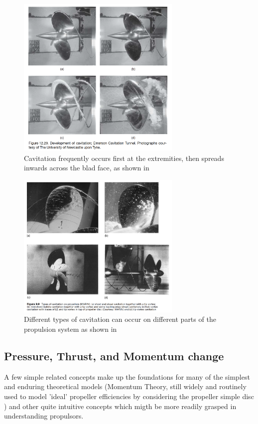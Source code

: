 \documentclass{article}\usepackage[]{graphicx}\usepackage[]{color}
\begin{document}
\begin{figure}
\includegraphics[width=0.7\textwidth]{IncreasingCavitation.png}
\caption{Cavitation frequently occurs first at the extremities, then spreads inwards across the blad face, as shown in \parencite{mollard2011}}
\label{fig:IncreasingCavitation.png}
\end{figure}

\begin{figure}
\includegraphics[width=0.7\textwidth]{CavitationTypes.png}
\caption{Different types of cavitation can occur on different parts of the propulsion system as shown in \parencite{carlton2007}}
\label{fig:CavitationTypes.png}
\end{figure}


\subsection{Pressure, Thrust, and Momentum change}
A few simple related concepts make up the foundations for many of the simplest and enduring theoretical models (Momentum Theory, still widely and routinely used to model 'ideal' propeller efficiencies by considering the propeller simple disc \parencite[169]{carlton2007}) and other quite intuitive concepts which migth be more readily grasped in understanding propulsors.
\end{document}
